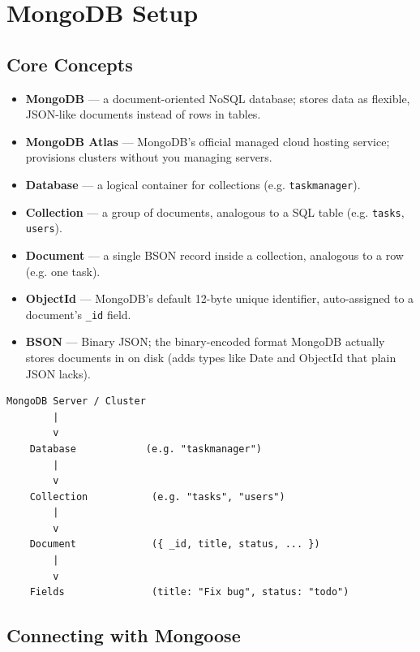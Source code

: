 \chapter{MongoDB Setup}

\section{Core Concepts}

\begin{itemize}
  \item \textbf{MongoDB} --- a document-oriented NoSQL database; stores data as flexible, JSON-like documents instead of rows in tables.
  \item \textbf{MongoDB Atlas} --- MongoDB's official managed cloud hosting service; provisions clusters without you managing servers.
  \item \textbf{Database} --- a logical container for collections (e.g. \texttt{taskmanager}).
  \item \textbf{Collection} --- a group of documents, analogous to a SQL table (e.g. \texttt{tasks}, \texttt{users}).
  \item \textbf{Document} --- a single BSON record inside a collection, analogous to a row (e.g. one task).
  \item \textbf{ObjectId} --- MongoDB's default 12-byte unique identifier, auto-assigned to a document's \texttt{\_id} field.
  \item \textbf{BSON} --- Binary JSON; the binary-encoded format MongoDB actually stores documents in on disk (adds types like Date and ObjectId that plain JSON lacks).
\end{itemize}

\begin{diagrambox}
\begin{verbatim}
MongoDB Server / Cluster
        |
        v
    Database            (e.g. "taskmanager")
        |
        v
    Collection           (e.g. "tasks", "users")
        |
        v
    Document             ({ _id, title, status, ... })
        |
        v
    Fields               (title: "Fix bug", status: "todo")
\end{verbatim}
\end{diagrambox}

\section{Connecting with Mongoose}

